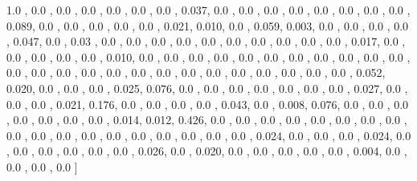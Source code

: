 \documentclass[usenames,dvipsnames]{article} %
\begin{document}
1.0  , 0.0  , 0.0  , 0.0  , 0.0  , 0.0  , 0.0  , 0.037, 0.0  , 0.0  , 0.0  , 0.0  , 0.0  , 0.0  , 0.0  , 0.0  , 0.089, 0.0  , 0.0  , 0.0  , 0.0  , 0.0  , 0.021, 0.010, 0.0  , 0.059, 0.003, 0.0  , 0.0  , 0.0  , 0.0  , 0.047, 0.0  , 0.03 , 0.0  , 0.0  , 0.0  , 0.0  , 0.0  , 0.0  , 0.0  , 0.0  , 0.0  , 0.0  , 0.017, 0.0  , 0.0  , 0.0  , 0.0  , 0.0  , 0.010, 0.0  , 0.0  , 0.0  , 0.0  , 0.0  , 0.0  , 0.0  , 0.0  , 0.0  , 0.0  , 0.0  , 0.0  , 0.0  , 0.0  , 0.0  , 0.0  , 0.0  , 0.0  , 0.0  , 0.0  , 0.0  , 0.0  , 0.0  , 0.0  , 0.0  , 0.052, 0.020, 0.0  , 0.0  , 0.0  , 0.025, 0.076, 0.0  , 0.0  , 0.0  , 0.0  , 0.0  , 0.0  , 0.0  , 0.027, 0.0  , 0.0  , 0.0  , 0.021, 0.176, 0.0  , 0.0  , 0.0  , 0.0  , 0.043, 0.0  , 0.008, 0.076, 0.0  , 0.0  , 0.0  , 0.0  , 0.0  , 0.0  , 0.0  , 0.014, 0.012, 0.426, 0.0  , 0.0  , 0.0  , 0.0  , 0.0  , 0.0  , 0.0  , 0.0  , 0.0  , 0.0  , 0.0  , 0.0  , 0.0  , 0.0  , 0.0  , 0.0  , 0.0  , 0.0  , 0.024, 0.0  , 0.0  , 0.0  , 0.024, 0.0  , 0.0  , 0.0  , 0.0  , 0.0  , 0.0  , 0.026, 0.0  , 0.020, 0.0  , 0.0  , 0.0  , 0.0  , 0.0  , 0.004, 0.0  , 0.0  , 0.0  , 0.0  ]
\end{document}
